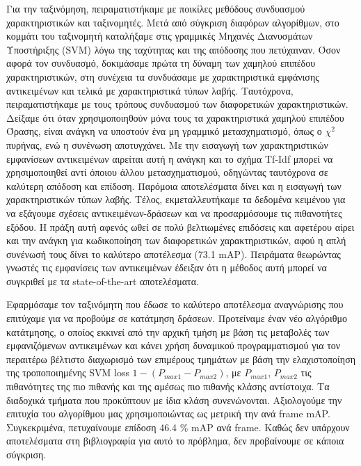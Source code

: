 \documentclass[11pt,a4paper,english,greek,twoside]{../Thesis}
\begin{document}
\par Για την ταξινόμηση, πειραματιστήκαμε με ποικίλες μεθόδους συνδυασμού χαρακτηριστικών και ταξινομητές. Μετά από σύγκριση διαφόρων αλγορίθμων, στο κομμάτι του ταξινομητή καταλήξαμε στις γραμμικές Μηχανές Διανυσμάτων Υποστήριξης (SVM) λόγω της ταχύτητας και της απόδοσης που πετύχαιναν. Όσον αφορά τον συνδυασμό, δοκιμάσαμε πρώτα τη δύναμη των χαμηλού επιπέδου χαρακτηριστικών, στη συνέχεια τα συνδυάσαμε με χαρακτηριστικά εμφάνισης αντικειμένων και τελικά με χαρακτηριστικά τύπων λαβής. Ταυτόχρονα, πειραματιστήκαμε με τους τρόπους συνδυασμού των διαφορετικών χαρακτηριστικών. Δείξαμε ότι όταν χρησιμοποιηθούν μόνα τους τα χαρακτηριστικά χαμηλού επιπέδου Όρασης, είναι ανάγκη να υποστούν ένα μη γραμμικό μετασχηματισμό, όπως ο $\chi^2$ πυρήνας, ενώ η συνένωση αποτυγχάνει. Με την εισαγωγή των χαρακτηριστικών εμφανίσεων αντικειμένων αιρείται αυτή η ανάγκη και το σχήμα Tf-Idf μπορεί να χρησιμοποιηθεί αντί όποιου άλλου μετασχηματισμού, οδηγώντας ταυτόχρονα σε καλύτερη απόδοση και επίδοση. Παρόμοια αποτελέσματα δίνει και η εισαγωγή των χαρακτηριστικών τύπων λαβής. Τέλος, εκμεταλλευτήκαμε τα δεδομένα κειμένου για να εξάγουμε σχέσεις αντικειμένων-δράσεων και να προσαρμόσουμε τις πιθανοτήτες εξόδου. Η πράξη αυτή αφενός ωθεί σε πολύ βελτιωμένες επιδόσεις και αφετέρου αίρει και την ανάγκη για κωδικοποίηση των διαφορετικών χαρακτηριστικών, αφού η απλή συνένωσή τους δίνει το καλύτερο αποτέλεσμα (73.1 mAP). Πειράματα θεωρώντας γνωστές τις εμφανίσεις των αντικειμένων έδειξαν ότι η μέθοδος αυτή μπορεί να συγκριθεί με τα state-of-the-art αποτελέσματα.

\par Εφαρμόσαμε τον ταξινόμητη που έδωσε το καλύτερο αποτέλεσμα αναγνώρισης που επιτύχαμε για να προβούμε σε κατάτμηση δράσεων. Προτείναμε έναν νέο αλγόριθμο κατάτμησης, ο οποίος εκκινεί από την αρχική τμήση με βάση τις μεταβολές των εμφανιζόμενων αντικειμένων και κάνει χρήση δυναμικού προγραμματισμού για τον περαιτέρω βέλτιστο διαχωρισμό των επιμέρους τμημάτων με βάση την ελαχιστοποίηση της τροποποιημένης SVM loss $1-(P_{max1}-P_{max2})$, με $P_{max1}$, $P_{max2}$ τις πιθανότητες της πιο πιθανής και της αμέσως πιο πιθανής κλάσης αντίστοιχα. Τα διαδοχικά τμήματα που προκύπτουν με ίδια κλάση συνενώνονται. Αξιολογούμε την επιτυχία του αλγορίθμου μας χρησιμοποιώντας ως μετρική την ανά frame mAP. Συγκεκριμένα, πετυχαίνουμε επίδοση 46.4 \% mAP ανά frame. Καθώς δεν υπάρχουν αποτελέσματα στη βιβλιογραφία για αυτό το πρόβλημα, δεν προβαίνουμε σε κάποια σύγκριση.
\end{document}
